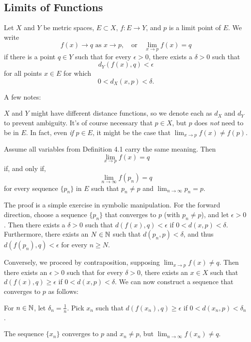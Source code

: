 \documentclass{article}
\begin{document}
\subsection{Limits of Functions}
\begin{definition}
    Let $X$ and $Y$ be metric spaces, $E\subset X$, $f:E\rightarrow Y$, and $p$ is a limit point of $E$. We write \[f(x)\rightarrow q\textrm{ as }x\rightarrow p,\quad\textrm{or}\quad\lim_{x\rightarrow p}f(x)=q\]if there is a point $q\in Y$ such that for every $\epsilon>0$, there exists a $\delta>0$ such that \[d_{Y}(f(x),q)<\epsilon\]for all points $x\in E$ for which \[0<d_{X}(x,p)<\delta.\]
\end{definition}
\begin{remark}
    A few notes:
    \begin{enumerate}
        \ii $X$ and $Y$ might have different distance functions, so we denote each as $d_{X}$ and $d_{Y}$ to prevent ambiguity.
        \ii It's of course necessary that $p\in X$, but $p$ does \textit{not} need to be in $E$. In fact, even \textit{if} $p\in E$, it might be the case that $\lim_{x\rightarrow p}f(x)\neq f(p)$.
    \end{enumerate}
\end{remark}    
\begin{theorem}
    Assume all variables from Definition 4.1 carry the same meaning. Then \[\lim_{x\rightarrow p}f(x)=q\]if, and only if, \[\lim_{n\rightarrow\infty}f(p_{n})=q\]for every sequence $\{p_{n}\}$ in $E$ such that $p_{n}\neq p$ and $\lim_{n\rightarrow\infty}p_{n}=p$.
\end{theorem}
\begin{remark}
    The proof is a simple exercise in symbolic manipulation. For the forward direction, choose a sequence $\{p_{n}\}$ that converges to $p$ (with $p_{n}\neq p$), and let $\epsilon>0$. Then there exists a $\delta>0$ such that $d(f(x),q)<\epsilon$ if $0<d(x,p)<\delta$. Furthermore, there exists an $N\in\mathbb N$ such that $d(p_{n},p)<\delta$, and thus $d(f(p_{n}),q)<\epsilon$ for every $n\geq N$. 
    
    Conversely, we proceed by contraposition, supposing $\lim_{x\rightarrow p}f(x)\neq q$. Then there exists an $\epsilon>0$ such that for every $\delta>0$, there exists an $x\in X$ such that $d(f(x),q)\geq \epsilon$ if $0<d(x,p)<\delta$. We can now construct a sequence that converges to $p$ as follows:
    \begin{enumerate}
        \ii For $n\in\mathbb N$, let $\delta_{n}=\frac{1}{n}$.
        \ii Pick $x_{n}$ such that $d(f(x_{n}),q)\geq\epsilon$ if $0<d(x_{n},p)<\delta_{n}$.
    \end{enumerate}
    The sequence $\{x_{n}\}$ converges to $p$ and $x_{n}\neq p$, but $\lim_{n\rightarrow\infty}f(x_{n})\neq q$.
\end{remark}
\end{document}
